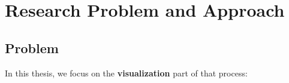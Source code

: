 \section{Research Problem and Approach}

\subsection{Problem}
In this thesis, we focus on the \textbf{visualization} part of that process:
\begin{center}
\end{center}





